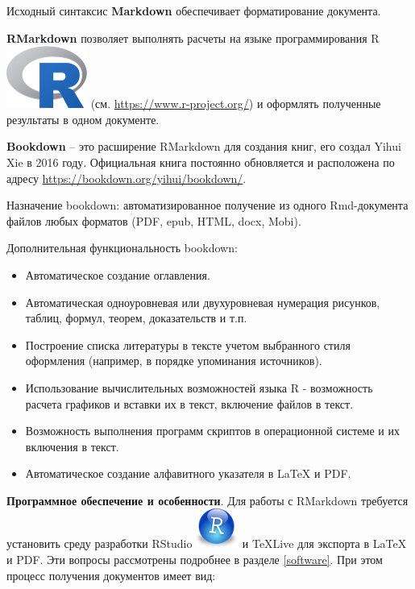 \documentclass[
  a4paper,
]{book}
\providecommand{\tightlist}{%
  \setlength{\itemsep}{0pt}\setlength{\parskip}{0pt}}
\theoremstyle{definition}
\theoremstyle{definition}
\theoremstyle{definition}
\theoremstyle{definition}
\theoremstyle{remark}
\begin{document}
Исходный синтаксис \textbf{Markdown} обеспечивает форматирование документа.

\textbf{RMarkdown} позволяет выполнять расчеты на языке программирования R \includegraphics{figures/Rlogo.png} (см. \url{https://www.r-project.org/}) и оформлять полученные результаты в одном документе.

\textbf{Bookdown} -- это расширение RMarkdown для создания книг, его создал Yihui Xie в 2016 году. Официальная книга постоянно обновляется и расположена по адресу \url{https://bookdown.org/yihui/bookdown/}.

Назначение bookdown: автоматизированное получение из одного Rmd-документа файлов любых форматов (PDF, epub, HTML, docx, Mobi).

Дополнительная функциональность bookdown:

\begin{itemize}
\tightlist
\item
  Автоматическое создание оглавления.
\item
  Автоматическая одноуровневая или двухуровневая нумерация рисунков, таблиц, формул, теорем, доказательств и т.п.
\item
  Построение списка литературы в тексте учетом выбранного стиля оформления (например, в порядке упоминания источников).
\item
  Использование вычислительных возможностей языка R - возможность расчета графиков и вставки их в текст, включение файлов в текст.
\item
  Возможность выполнения программ скриптов в операционной системе и их включения в текст.
\item
  Автоматическое создание алфавитного указателя в LaTeX и PDF.
\end{itemize}

\textbf{Программное обеспечение и особенности}. Для работы с RMarkdown требуется установить среду разработки RStudio \includegraphics{figures/rstudio.png} и TeXLive для экспорта в LaTeX и PDF. Эти вопросы рассмотрены подробнее в разделе \ref{software}. При этом процесс получения документов имеет вид:
\end{document}
